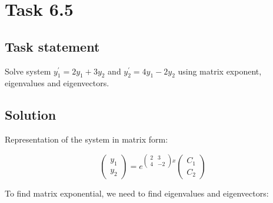 \section*{Task 6.5}

\subsection*{Task statement}

Solve system $y_1^{\prime} = 2y_1 + 3y_2$ and $y_2^{\prime} = 4y_1 - 2y_2$ using matrix exponent, eigenvalues and eigenvectors.

\subsection*{Solution}

Representation of the system in matrix form:

\[\begin{pmatrix} y_1 \\ y_2 \end{pmatrix} = e^{\begin{pmatrix} 2 & 3 \\ 4 & -2 \end{pmatrix}x} \begin{pmatrix} C_1 \\ C_2 \end{pmatrix} \]

To find matrix exponential, we need to find eigenvalues and eigenvectors:

